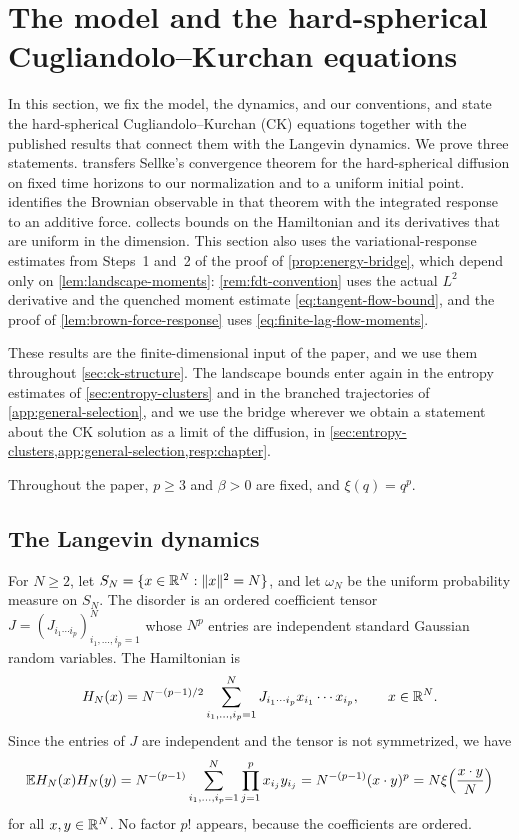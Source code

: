 \chapter{The model and the hard-spherical Cugliandolo--Kurchan equations}\label{sec:model}

In this section, we fix the model, the dynamics, and our conventions, and state the hard-spherical Cugliandolo--Kurchan (CK) equations together with the published results that connect them with the Langevin dynamics. We prove three statements.  transfers Sellke's convergence theorem for the hard-spherical diffusion on fixed time horizons \cite[arXiv version~5, Theorem~4.3, p.~23]{sellke2024} to our normalization and to a uniform initial point.  identifies the Brownian observable in that theorem with the integrated response to an additive force.  collects bounds on the Hamiltonian and its derivatives that are uniform in the dimension. This section also uses the variational-response estimates from Steps~1 and~2 of the proof of \cref{prop:energy-bridge}, which depend only on \cref{lem:landscape-moments}: \cref{rem:fdt-convention} uses the actual $L^2$ derivative and the quenched moment estimate \eqref{eq:tangent-flow-bound}, and the proof of \cref{lem:brown-force-response} uses \eqref{eq:finite-lag-flow-moments}.

These results are the finite-dimensional input of the paper, and we use them throughout \cref{sec:ck-structure}. The landscape bounds enter again in the entropy estimates of \cref{sec:entropy-clusters} and in the branched trajectories of \cref{app:general-selection}, and we use the bridge wherever we obtain a statement about the CK solution as a limit of the diffusion, in \cref{sec:entropy-clusters,app:general-selection,resp:chapter}.

Throughout the paper, $p\ge3$ and $\beta>0$ are fixed, and $\xi(q)=q^p$.

\section{The Langevin dynamics}\label{sec:langevin}

For $N\ge2$, let $S_N=\{x\in\mathbb R^N:\lVert x\rVert^2=N\}$, and let $\omega_N$ be the uniform probability measure on $S_N$. The disorder is an ordered coefficient tensor $J=(J_{i_1\cdots i_p})_{i_1,\dots,i_p=1}^N$ whose $N^p$ entries are independent standard Gaussian random variables. The Hamiltonian is
\begin{equation}
 H_N(x)=N^{-(p-1)/2}\sum_{i_1,\ldots,i_p=1}^N
 J_{i_1\cdots i_p}x_{i_1}\cdots x_{i_p},\qquad x\in\mathbb R^N.
 \label{eq:hamiltonian}
\end{equation}
Since the entries of $J$ are independent and the tensor is not symmetrized, we have
\begin{equation}\label{eq:hamiltonian-covariance}
 \mathbb E H_N(x)H_N(y)
 =N^{-(p-1)}\sum_{i_1,\ldots,i_p=1}^N\prod_{j=1}^px_{i_j}y_{i_j}
 =N^{-(p-1)}(x\cdot y)^p
 =N\xi\Bigl(\frac{x\cdot y}{N}\Bigr)
\end{equation}
for all $x,y\in\mathbb R^N$. No factor $p!$ appears, because the coefficients are ordered.

